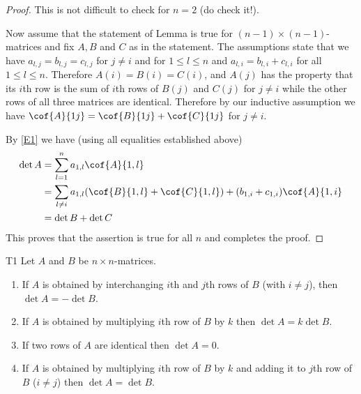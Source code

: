 \begin{proof} 
This is not difficult to check for $n=2$ (do check it!). 

Now assume that the statement of Lemma is true for $(n-1)\times (n-1)$-matrices and 
fix $A,B$ and $C$ as in the statement. 
The assumptions state that 
we have  $a_{l,j}=b_{l,j}=c_{l,j}$ for $j\neq i$ and for $1\leq l\leq n$
and $a_{l,i}=b_{l,i}+c_{l,i}$ for all $1\leq l\leq n$. 
Therefore $A(i)=B(i)=C(i)$, and $A(j)$ has the property that 
its $i$th row is the sum of $i$th rows of $B(j)$ and $C(j)$ for $j\neq i$ while the  other rows of all three matrices are identical.  
Therefore by our inductive assumption we have $\cof{A}{1j}=\cof{B}{1j}+\cof{C}{1j}$
for $j\neq i$. 

By \eqref{E1} we have (using all equalities established above) 
\begin{align*}
\det A&=\sum_{l=1}^n a_{1,l} \cof{A}{1,l}\\
 &=\sum_{l\neq i} a_{1,l}(\cof{B}{1,l}+\cof{C}{1,l})+ 
(b_{1,i}+c_{1,i})\cof{A}{1,i}\\
&=
\det B+\det C
\end{align*}
This proves that the assertion is true for all $n$ and completes the proof.  
\end{proof} 

\begin{theorem}{} {T1} 
Let $A$ and $B$ be $n\times n$-matrices. 
\begin{enumerate}
\item If $A$ is obtained by interchanging $i$th and $j$th rows  of $B$ (with $i\neq j$), then $\det A=-\det B$. 
\item If $A$ is obtained by multiplying $i$th row of $B$ by $k$ then $\det A=k\det B$. 
\item If two rows of $A$ are identical then $\det A=0$. 
\item If $A$ is obtained by multiplying $i$th row of $B$ by $k$ and adding it to 
$j$th row of $B$ ($i\neq j$) then $\det A=\det B$. 
\end{enumerate}
\end{theorem}

